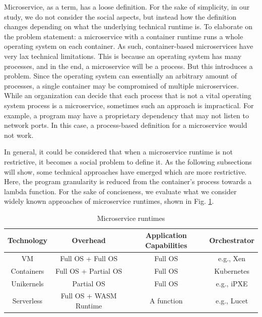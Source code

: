 \documentclass{IEEEtran}
\begin{document}
Microservice, as a term, has a loose definition. For the sake of simplicity, in our study, we do not consider the social aspects, but instead how the definition changes depending on what the underlying technical runtime is. To elaborate on the problem statement: a microservice with a container runtime runs a whole operating system on each container. As such, container-based microservices have very lax technical limitations. This is because an operating system has many processes, and in the end, a microservice will be a process. But this introduces a problem. Since the operating system can essentially an arbitrary amount of processes, a single container may be compromised of multiple microservices. While an organization can decide that each process that is not a vital operating system process is a microservice, sometimes such an approach is impractical. For example, a program may have a proprietary dependency that may not listen to network ports. In this case, a process-based definition for a microservice would not work.

In general, it could be considered that when a microservice runtime is not restrictive, it becomes a social problem to define it. As the following subsections will show, some technical approaches have emerged which are more restrictive. Here, the program granularity is reduced from the container's process towards a lambda function. For the sake of conciseness, we evaluate what we consider widely known approaches of microservice runtimes, shown in Fig. \ref{tb:runtimes}.

\begin{table}
\begin{center}
\caption{Microservice runtimes}
\begin{tabular}{ c|c|c|c } 
 Technology & Overhead & Application Capabilities & Orchestrator \\
 \hline
 VM & Full OS + Full OS & Full OS & e.g., Xen \\ 
 Containers & Full OS + Partial OS & Full OS & Kubernetes \cite{burns2016borg} \\ 
 Unikernels & Partial OS  & Full OS & e.g., iPXE  \\ 
 Serverless & Full OS + WASM Runtime  & A function & e.g., Lucet \\
\end{tabular}
\end{center}
\label{tb:runtimes}
\end{table}
\end{document}
